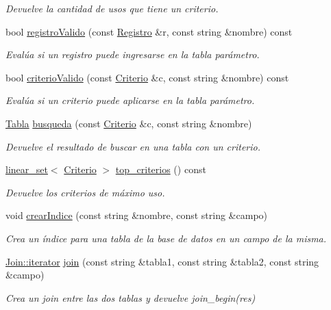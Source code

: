\begin{DoxyCompactItemize}
\begin{DoxyCompactList}\small\item\em Devuelve la cantidad de usos que tiene un criterio. \end{DoxyCompactList}\item 
bool \hyperlink{classBaseDeDatos_a451ef7b34a2ff9d395da10745266b703}{registro\-Valido} (const \hyperlink{classRegistro}{Registro} \&r, const string \&nombre) const 
\begin{DoxyCompactList}\small\item\em Evalúa si un registro puede ingresarse en la tabla parámetro. \end{DoxyCompactList}\item 
bool \hyperlink{classBaseDeDatos_a43f25f2c23796d5133c75f1973898b36}{criterio\-Valido} (const \hyperlink{classBaseDeDatos_a6742a222e87623bc92a810a693fb337b}{Criterio} \&c, const string \&nombre) const 
\begin{DoxyCompactList}\small\item\em Evalúa si un criterio puede aplicarse en la tabla parámetro. \end{DoxyCompactList}\item 
\hyperlink{classTabla}{Tabla} \hyperlink{classBaseDeDatos_aa0676f34e537e650095e55b3eef852cb}{busqueda} (const \hyperlink{classBaseDeDatos_a6742a222e87623bc92a810a693fb337b}{Criterio} \&c, const string \&nombre)
\begin{DoxyCompactList}\small\item\em Devuelve el resultado de buscar en una tabla con un criterio. \end{DoxyCompactList}\item 
\hyperlink{classlinear__set}{linear\-\_\-set}$<$ \hyperlink{classBaseDeDatos_a6742a222e87623bc92a810a693fb337b}{Criterio} $>$ \hyperlink{classBaseDeDatos_a907976b069e65a933e025035d887a3b5}{top\-\_\-criterios} () const 
\begin{DoxyCompactList}\small\item\em Devuelve los criterios de máximo uso. \end{DoxyCompactList}\item 
void \hyperlink{classBaseDeDatos_a9ec2a34b6864548e9e34d2f3142daa44}{crear\-Indice} (const string \&nombre, const string \&campo)
\begin{DoxyCompactList}\small\item\em Crea un índice para una tabla de la base de datos en un campo de la misma. \end{DoxyCompactList}\item 
\hyperlink{structBaseDeDatos_1_1Join_1_1iterator}{Join\-::iterator} \hyperlink{classBaseDeDatos_a90db1eea7c903c7c736abd45eea0e855}{join} (const string \&tabla1, const string \&tabla2, const string \&campo)
\begin{DoxyCompactList}\small\item\em Crea un join entre las dos tablas y devuelve join\-\_\-begin(res) \end{DoxyCompactList}\end{DoxyCompactItemize}
